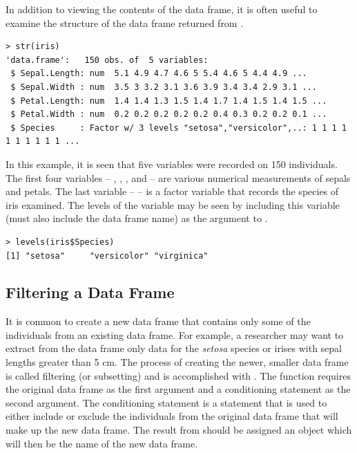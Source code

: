 \documentclass[10pt,openany]{book}\usepackage[]{graphicx}\usepackage[]{color}
\makeatletter
\newenvironment{kframe}{%
 \def\at@end@of@kframe{}%
 \ifinner\ifhmode%
  \def\at@end@of@kframe{\end{minipage}}%
  \begin{minipage}{\columnwidth}%
 \fi\fi%
 \def\FrameCommand##1{\hskip\@totalleftmargin \hskip-\fboxsep
 \colorbox{shadecolor}{##1}\hskip-\fboxsep
     \hskip-\linewidth \hskip-\@totalleftmargin \hskip\columnwidth}%
 \MakeFramed {\advance\hsize-\width
   \@totalleftmargin\z@ \linewidth\hsize
   \@setminipage}}%
 {\par\unskip\endMakeFramed%
 \at@end@of@kframe}
\newenvironment{knitrout}{}{} %
\makeatother
\begin{document}
In addition to viewing the contents of the data frame, it is often useful to examine the structure of the data frame returned from .
\begin{knitrout}
\color{fgcolor}\begin{kframe}
\begin{verbatim}
> str(iris)
'data.frame':	150 obs. of  5 variables:
 $ Sepal.Length: num  5.1 4.9 4.7 4.6 5 5.4 4.6 5 4.4 4.9 ...
 $ Sepal.Width : num  3.5 3 3.2 3.1 3.6 3.9 3.4 3.4 2.9 3.1 ...
 $ Petal.Length: num  1.4 1.4 1.3 1.5 1.4 1.7 1.4 1.5 1.4 1.5 ...
 $ Petal.Width : num  0.2 0.2 0.2 0.2 0.2 0.4 0.3 0.2 0.2 0.1 ...
 $ Species     : Factor w/ 3 levels "setosa","versicolor",..: 1 1 1 1 1 1 1 1 1 1 ...
\end{verbatim}
\end{kframe}
\end{knitrout}
In this example, it is seen that five variables were recorded on 150 individuals.  The first four variables -- , , , and  -- are various numerical measurements of sepals and petals.  The last variable --  -- is a factor variable that records the species of iris examined.  The levels of the  variable may be seen by including this variable (must also include the data frame name) as the argument to .
\begin{knitrout}
\color{fgcolor}\begin{kframe}
\begin{verbatim}
> levels(iris$Species)
[1] "setosa"     "versicolor" "virginica" 
\end{verbatim}
\end{kframe}
\end{knitrout}

\vspace{-12pt}
\subsection{Filtering a Data Frame}  \label{sect:RSubsetdf}
\vspace{-12pt}
It is common to create a new data frame that contains only some of the individuals from an existing data frame.  For example, a researcher may want to extract from the  data frame only data for the \emph{setosa} species or irises with sepal lengths greater than 5 cm.  The process of creating the newer, smaller data frame is called filtering (or subsetting) and is accomplished with .  The  function requires the original data frame as the first argument and a conditioning statement as the second argument.  The conditioning statement is a statement that is used to either include or exclude the individuals from the original data frame that will make up the new data frame.  The result from  should be assigned an object which will then be the name of the new data frame.
\end{document}
